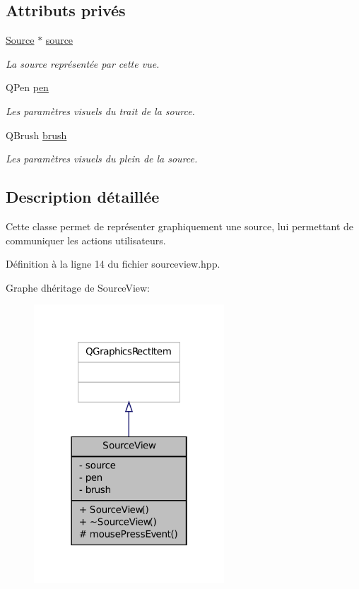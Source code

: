 \subsection*{Attributs privés}
\begin{DoxyCompactItemize}
\item 
\hyperlink{classSource}{Source} $\ast$ \hyperlink{classSourceView_a79354c401511132bfe754ce5d92b8d23}{source}
\begin{DoxyCompactList}\small\item\em La source représentée par cette vue. \end{DoxyCompactList}\item 
Q\+Pen \hyperlink{classSourceView_a3f838e39f9e01a2a547b164c28193170}{pen}
\begin{DoxyCompactList}\small\item\em Les paramètres visuels du trait de la source. \end{DoxyCompactList}\item 
Q\+Brush \hyperlink{classSourceView_ab1337e79e435bc3310c34acef403d9d2}{brush}
\begin{DoxyCompactList}\small\item\em Les paramètres visuels du plein de la source. \end{DoxyCompactList}\end{DoxyCompactItemize}


\subsection{Description détaillée}
Cette classe permet de représenter graphiquement une source, lui permettant de communiquer les actions utilisateurs. 

Définition à la ligne 14 du fichier sourceview.\+hpp.



Graphe d\textquotesingle{}héritage de Source\+View\+:\nopagebreak
\begin{figure}[H]
\begin{center}
\leavevmode
\includegraphics[width=202pt]{de/ddc/classSourceView__inherit__graph}
\end{center}
\end{figure}


